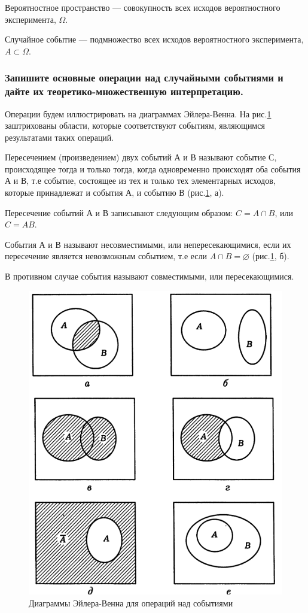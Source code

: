 \documentclass{book}
\begin{document}
Вероятностное пространство --- совокупность всех исходов вероятностного эксперимента, $\Omega$.

Случайное событие --- подмножество всех исходов вероятностного эксперимента, $A\subset\Omega$.

\subsubsection*{Запишите основные операции над случайными событиями и дайте их теоретико-множественную интерпретацию.}

Операции будем иллюстрировать на диаграммах Эйлера-Венна. На рис.\ref{fig:2} заштрихованы области, которые соответствуют событиям, являющимся результатами таких операций.

Пересечением (произведением) двух событий А и В называют событие С, происходящее тогда и только тогда, когда одновременно происходят оба события А и В, т.е событие, состоящее из тех и только тех элементарных исходов, которые принадлежат и события А, и событию В (рис.\ref{fig:2}, а).

Пересечение событий А и В записывают следующим образом: $C=A\cap B$, или $C=AB$.

События А и В называют несовместимыми, или непересекающимися, если их пересечение является невозможным событием, т.е если $A\cap B=\varnothing$ (рис.\ref{fig:2}, б).

В противном случае события называют совместимыми, или пересекающимися.

\begin{figure}[h!]
  \centering
  \includegraphics[width=.7\textwidth]{./pictures/2.png}
  \caption{Диаграммы Эйлера-Венна для операций над событиями}
  \label{fig:2}
\end{figure}
\end{document}
